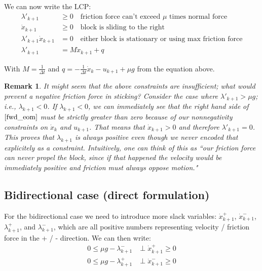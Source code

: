 \documentclass{article}
\newtheorem{remark}{Remark}
\begin{document}
We can now write the LCP:
\begin{align*}
    \lambda'_{k+1} &\geq 0 \quad \textrm{friction force can't exceed $\mu$ times normal force} \\
    \dot x_{k+1} &\geq 0 \quad \textrm{block is sliding to the right} \\
    \lambda'_{k+1} \dot x_{k+1} &= 0 \quad \textrm{either block is stationary or using max friction force} \\
    \lambda'_{k+1} &= M \dot x_{k+1} + q
\end{align*}

With $M = \frac{1}{\Delta t}$ and $q = - \frac{1}{\Delta t} \dot x_k - u_{k+1} + \mu g$ from the equation above.

\begin{remark}
    It might seem that the above constraints are insufficient; what would prevent a negative friction force in sticking? Consider the case where $\lambda'_{k+1} > \mu g$; i.e., $\lambda_{k+1} < 0$. If $\lambda_{k+1} < 0$, we can immediately see that the right hand side of $\eqref{fwd_eom}$ must be strictly greater than zero because of our nonnegativity constraints on $\dot x_k$ and $u_{k+1}$. That means that $\dot x_{k+1} > 0$ and therefore $\lambda'_{k+1} = 0$. This proves that $\lambda_{k+1}$ is always positive even though we never encoded that explicitely as a constraint. Intuitively, one can think of this as ``our friction force can never propel the block, since if that happened the velocity would be immediately positive and friction must always oppose motion."
\end{remark}

\subsection{Bidirectional case (direct formulation)}
For the bidirectional case we need to introduce more slack variables: $\dot x_{k+1}^+$, $\dot x_{k+1}^-$, $\lambda_{k+1}^+$, and $\lambda_{k+1}^-$, which are all positive numbers representing velocity / friction force in the + / - direction. We can then write:
\begin{align*}
    0 \leq \mu g - \lambda_{k+1}^- &\perp \dot x_{k+1}^+ \geq 0 \\
    0 \leq \mu g - \lambda_{k+1}^+ &\perp \dot x_{k+1}^- \geq 0
\end{align*}
\end{document}

